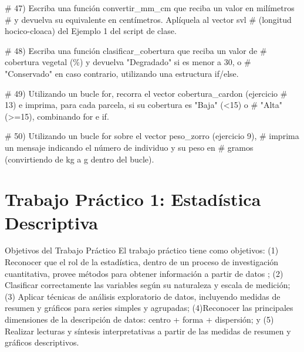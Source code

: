\documentclass[
  spanish,
  letterpaper,
  DIV=11,
  numbers=noendperiod]{scrreprt}
\newenvironment{Shaded}{\begin{snugshade}}{\end{snugshade}}
\newcommand{\CommentTok}[1]{\textcolor[rgb]{0.37,0.37,0.37}{#1}}
\begin{document}
\begin{Shaded}
\begin{Highlighting}[]
\CommentTok{\# 47) Escriba una función \textquotesingle{}convertir\_mm\_cm\textquotesingle{} que reciba un valor en milímetros}
\CommentTok{\#     y devuelva su equivalente en centímetros. Aplíquela al vector \textquotesingle{}svl\textquotesingle{}}
\CommentTok{\#     (longitud hocico{-}cloaca) del Ejemplo 1 del script de clase.}


\CommentTok{\# 48) Escriba una función \textquotesingle{}clasificar\_cobertura\textquotesingle{} que reciba un valor de}
\CommentTok{\#     cobertura vegetal (\%) y devuelva "Degradado" si es menor a 30, o}
\CommentTok{\#     "Conservado" en caso contrario, utilizando una estructura if/else.}


\CommentTok{\# 49) Utilizando un bucle for, recorra el vector \textquotesingle{}cobertura\_cardon\textquotesingle{} (ejercicio}
\CommentTok{\#     13) e imprima, para cada parcela, si su cobertura es "Baja" (\textless{}15) o}
\CommentTok{\#     "Alta" (\textgreater{}=15), combinando for e if.}


\CommentTok{\# 50) Utilizando un bucle for sobre el vector \textquotesingle{}peso\_zorro\textquotesingle{} (ejercicio 9),}
\CommentTok{\#     imprima un mensaje indicando el número de individuo y su peso en}
\CommentTok{\#     gramos (convirtiendo de kg a g dentro del bucle).}
\end{Highlighting}
\end{Shaded}


\chapter{Trabajo Práctico 1: Estadística
Descriptiva}\label{trabajo-pruxe1ctico-1-estaduxedstica-descriptiva}

Objetivos del Trabajo Práctico El trabajo práctico tiene como objetivos:
(1) Reconocer que el rol de la estadística, dentro de un proceso de
investigación cuantitativa, provee métodos para obtener información a
partir de datos ; (2) Clasificar correctamente las variables según su
naturaleza y escala de medición; (3) Aplicar técnicas de análisis
exploratorio de datos, incluyendo medidas de resumen y gráficos para
series simples y agrupadas; (4)Reconocer las principales dimensiones de
la descripción de datos: centro + forma + dispersión; y (5) Realizar
lecturas y síntesis interpretativas a partir de las medidas de resumen y
gráficos descriptivos.
\end{document}
